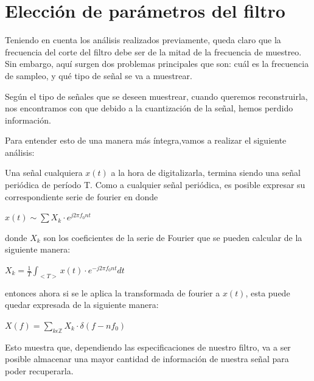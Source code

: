 \documentclass[../../ASSD_TP1_G7.tex]{subfiles}
\begin{document}
\section{Elección de parámetros del filtro}

Teniendo en cuenta los análisis realizados previamente, queda claro
que la frecuencia del corte del filtro debe ser de la mitad de la
frecuencia de muestreo. Sin embargo, aquí surgen dos problemas principales
que son: cuál es la frecuencia de sampleo, y qué tipo de señal se
va a muestrear.

Según el tipo de señales que se deseen muestrear, cuando queremos
reconstruirla, nos encontramos con que debido a la cuantización de
la señal, hemos perdido información. 

Para entender esto de una manera más íntegra,vamos a realizar el siguiente
análisis:

Una señal cualquiera $x(t)$ a la hora de digitalizarla, termina siendo
una señal periódica de período T. Como a cualquier señal periódica,
es posible expresar su correspondiente serie de fourier en donde
\begin{center}
\textit{\Large{}$x(t)\sim\sum X_{k}\cdot e^{j2\pi f_{0}nt}$}{\Large\par}
\par\end{center}

donde $X_{k}$ son los coeficientes de la serie de Fourier que se
pueden calcular de la siguiente manera:
\begin{center}
\textit{\Large{}$X_{k}=\frac{1}{T}\int_{<T>}x(t)\cdot e^{-j2\pi f_{0}nt}dt$}{\Large\par}
\par\end{center}

entonces ahora si se le aplica la transformada de fourier a $x(t)$,
esta puede quedar expresada de la siguiente manera:
\begin{center}
\textit{\Large{}$X(f)=\sum_{k\epsilon\mathbb{Z}}X_{k}\cdot\delta(f-nf_{0})$}{\Large\par}
\par\end{center}

Esto muestra que, dependiendo las especificaciones de nuestro filtro,
va a ser posible almacenar una mayor cantidad de información de nuestra
señal para poder recuperarla. 
\end{document}
